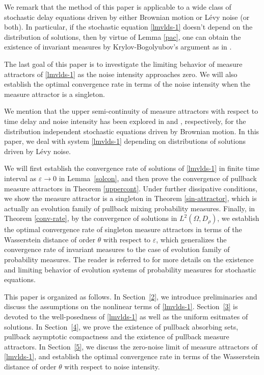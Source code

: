 \documentclass[11pt]{article}
\numberwithin{equation}{section}
\theoremstyle{plain}
\begin{document}
    
                   
 We 
 remark that
 the method of this paper
  is  applicable to 
  a  wide class of
   stochastic delay equations driven by 
   either Brownian motion or L\'{e}vy noise
   (or both).
   In particular,  
if  the stochastic equation
 \eqref{lmvlds-1} doesn't depend on the distribution of solutions, 
 then 
 by virtue of Lemma \ref{pac}, 
 one can obtain the existence of invariant measures   
  by   Krylov-Bogolyubov's argument
   as in \cite{RRG2006SPA, bc2016Stoch}.
  
The last goal of this paper is
to investigate the limiting behavior
of measure attractors
of  \eqref{lmvlds-1} 
as the noise intensity
approaches zero.
We will also establish the optimal
convergence rate
in terms of the noise intensity
  when the measure attractor
is a singleton.
 
We mention that
the   upper semi-continuity  of   measure attractors with respect to time delay  
and noise intensity
has been explored in
 \cite{CWZ2025JNS} and   \cite{mll2024AMO},
 respectively,
 for the distribution independent
   stochastic equations driven by Brownian motion.
   In this paper, we deal with system
   \eqref{lmvlds-1}    depending 
   on distributions of solutions
   driven by 
   L\'{e}vy noise.
   
   We will first
   establish the convergence rate of 
   solutions of
   \eqref{lmvlds-1} 
   in finite time interval as
   $\varepsilon
   \to 0$ in Lemma~\ref{solcon},
   and then  
   prove the convergence of pullback measure attractors  
 in Theorem \ref{uppercont}.  
 Under further dissipative conditions,
 we show the measure attractor is  
 a singleton
  in Theorem \ref{sin-attractor},
  which is actually 
  an evolution family of 
  pullback mixing
  probability measures.
  Finally, in Theorem \ref{conv-rate},
  by the convergence of solutions in $L^2(\Omega, D_\rho)$,
  we  establish the optimal convergence rate of 
  singleton
   measure attractors  in
   terms of the  Wasserstein distance of order $\theta$ with respect to $\varepsilon$,
 which generalizes the convergence rate of invariant measures \cite{CW2024AML} to 
 the case of evolution family of probability measures.
 The reader is referred to \cite{DR2007, LL2025CMP, WCT2023PAMS} for more details
 on the existence and  limiting    behavior of   evolution systems of probability measures
 for stochastic equations.


This paper is organized as follows. 
 In Section~\ref{2},
  we introduce  preliminaries and 
 discuss the  assumptions
 on the nonlinear terms
 of    \eqref{lmvlds-1}.
  Section~\ref{3} is devoted to the well-posedness of \eqref{lmvlds-1} as well
  as the uniform esitmates of solutions. 
In Section~\ref{4},
 we 
prove the existence of pullback absorbing sets,
  pullback asymptotic compactness 
 and the existence of pullback
 measure attractors.
 In Section~\ref{5},
  we discuss
  the zero-noise limit of  measure attractors 
  of \eqref{lmvlds-1},
  and establish the optimal convergence rate in
  terms of the Wasserstein distance of order $\theta$ 
   with respect to noise intensity.  
\end{document}
